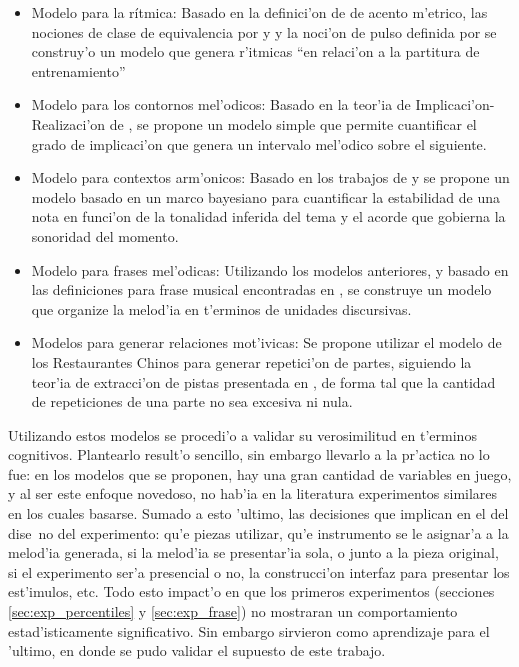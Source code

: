 \begin{itemize}
 \item Modelo para la r\'itmica: Basado en la definici'on de \cite{LerdahlJackendoff83} de acento m'etrico, las nociones de 
 clase de equivalencia por \cite{Benjamin84} y \cite{clarke1987categorical} y la noci'on de pulso definida por \cite{snyder2001}
 se construy'o un modelo que genera r'itmicas ``en relaci'on a la partitura de entrenamiento''

 \item Modelo para los contornos mel'odicos: Basado en la teor'ia de Implicaci'on-Realizaci'on de \cite{Narmour90}, 
 se propone un modelo simple que permite cuantificar el grado de implicaci'on que genera un intervalo mel'odico sobre el siguiente.

 \item Modelo para contextos arm'onicos: Basado en los trabajos de \cite{Krumhansl90} y \cite{Lerdahl2001} se propone un 
 modelo basado en un marco bayesiano para cuantificar la estabilidad de una nota en funci'on de la tonalidad inferida del tema y 
 el acorde que gobierna la sonoridad del momento.

 \item Modelo para frases mel'odicas: Utilizando los modelos anteriores, y basado en las definiciones para frase musical encontradas
 en \cite{rothstein1989phrase}, se construye un modelo que organize la melod'ia en t'erminos de unidades discursivas.

 \item Modelos para generar relaciones mot'ivicas: Se propone utilizar el modelo de los Restaurantes Chinos \citep{Teh2007} 
 para generar repetici'on de partes, siguiendo la teor'ia de extracci'on de pistas presentada en \cite{Deliege90}, de forma tal 
 que la cantidad de repeticiones de una parte no sea excesiva ni nula.

\end{itemize}

Utilizando estos modelos se procedi'o a validar su verosimilitud en t'erminos cognitivos. Plantearlo result'o sencillo, sin embargo
llevarlo a la pr'actica no lo fue: en los modelos que se proponen, hay una gran cantidad de variables en juego, y al ser este 
enfoque novedoso, no hab'ia en la literatura experimentos similares en los cuales basarse. Sumado a esto 'ultimo, las decisiones
que implican en el del dise~no del experimento: qu'e piezas utilizar, qu'e instrumento se le asignar'a a la melod'ia generada, 
si la melod'ia se presentar'ia sola, o junto a la pieza original, si el experimento ser'a presencial o no, la construcci'on 
interfaz para presentar los est'imulos, etc.  Todo esto impact'o en que los primeros experimentos (secciones 
\ref{sec:exp_percentiles} y \ref{sec:exp_frase}) no mostraran un comportamiento estad'isticamente significativo. Sin embargo
sirvieron como aprendizaje para el 'ultimo, en donde se pudo validar el supuesto de este trabajo. 


